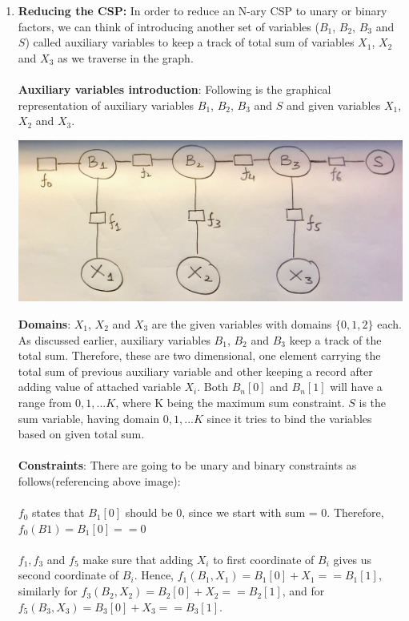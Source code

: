 \documentclass[12pt]{article}
\begin{document}
\begin{enumerate}[label=(\alph*)]
  \item \textbf{Reducing the CSP:} In order to reduce an N-ary CSP to unary or binary factors, we can think of introducing another set of variables ($B_1$, $B_2$, $B_3$ and $S$) called auxiliary variables to keep a track of total sum of variables $X_1$, $X_2$ and $X_3$ as we traverse in the graph.\\ \\
  \textbf{Auxiliary variables introduction}: Following is the graphical representation of auxiliary variables $B_1$, $B_2$, $B_3$ and $S$ and given variables $X_1$, $X_2$ and $X_3$.
  \begin{center}
  \includegraphics[scale=0.1]{IMG_2240.jpg}
  \end{center}
  \textbf{Domains}: $X_1$, $X_2$ and $X_3$ are the given variables with domains $\{0, 1, 2\}$ each. As discussed earlier, auxiliary variables $B_1$, $B_2$ and $B_3$ keep a track of the total sum. Therefore, these are two dimensional, one element carrying the total sum of previous auxiliary variable and other keeping a record after adding value of attached variable $X_i$. Both $B_n[0]$ and $B_n[1]$ will have a range from $0, 1, ... K$, where K being the maximum sum constraint. $S$ is the sum variable, having domain $0, 1, ... K$ since it tries to bind the variables based on given total sum. \\ \\
  \textbf{Constraints}: There are going to be unary and binary constraints as follows(referencing above image): \\ \\
  $f_0$ states that $B_1[0]$ should be 0, since we start with sum = 0. Therefore, $f_0(B1) = B_1[0] == 0$ \\ \\
  $f_1, f_3$ and $f_5$ make sure that adding $X_i$ to first coordinate of $B_i$ gives us second coordinate of $B_i$. Hence, $f_1(B_1, X_1) = B_1[0] + X_1 == B_1[1]$, similarly for $f_3(B_2, X_2) = B_2[0] + X_2 == B_2[1]$, and for $f_5(B_3, X_3) = B_3[0] + X_3 == B_3[1]$. \\ \\

\end{enumerate}
\end{document}
